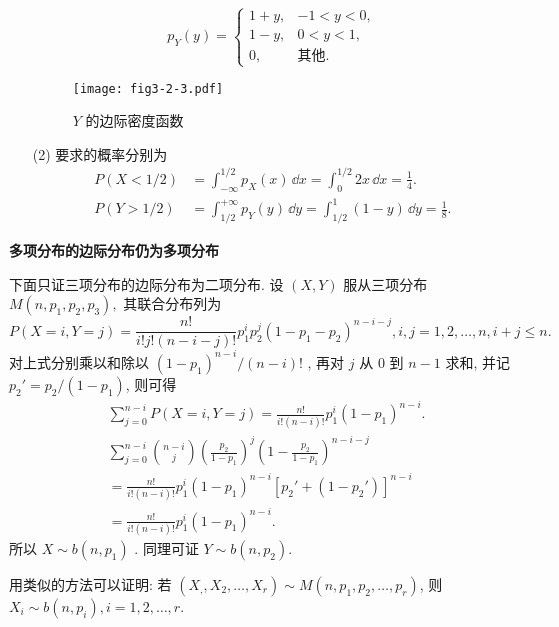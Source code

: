 \begin{solution}
\begin{itemize}
\begin{equation*}
  		p_{Y}(y)=
  		\begin{cases}
  		1+y, & -1<y<0,\\
  		1-y, & 0<y<1,\\
  		0, & \text{其他}.
  		\end{cases}
  		\end{equation*}
  		\begin{figure}[h]
  			\centering
  			\texttt{[image: fig3-2-3.pdf]}
  			\caption{ $Y$ 的边际密度函数}\label{fig:3.2.3}
  		\end{figure}
  		\item[(2)] 要求的概率分别为
  		\begin{align*}
  		P(X<1/2) &= \int_{-\infty}^{1/2}p_{X}(x)\,\dd x=\int_{0}^{1/2}2x\,\dd x=\frac{1}{4}.\\
  		P(Y>1/2) &= \int_{1/2}^{+\infty}p_{Y}(y)\,\dd y=\int_{1/2}^{1}(1-y)\,\dd y=\frac{1}{8}.
  		\end{align*}
  	\end{itemize}
  \end{solution}
  
  \begin{example}\label{exam:3.2.4}
  	\textbf{多项分布的边际分布仍为多项分布}
  \end{example}
  \begin{solution}
  	下面只证三项分布的边际分布为二项分布. 设 $(X,Y)$ 服从三项分布 $M(n,p_1,p_2,p_3),$  其联合分布列为
  	\begin{equation*}
  	P(X=i,Y=j)=\frac{n!}{i!j!(n-i-j)!}p_1^ip_2^j(1-p_1-p_2)^{n-i-j}, i,j=1,2,\ldots,n,i+j\leqslant n.
  	\end{equation*}
  	对上式分别乘以和除以 $(1-p_1)^{n-i}/(n-i)!$ , 再对 $j$ 从 $0$ 到 $n-1$ 求和, 并记 $p_2'=p_2/(1-p_1)$, 则可得
  	\begin{align*}
  	&\sum_{j=0}^{n-i}P(X=i,Y=j) = \frac{n!}{i!(n-i)!}p_1^i(1-p_1)^{n-i}.\\
  	&\sum_{j=0}^{n-i} \binom{n-i}{j} \left(\frac{p_2}{1-p_1}\right)^{j}\left(1-\frac{p_2}{1-p_1}\right)^{n-i-j} \\
  	&= \frac{n!}{i!(n-i)!}p_1^i(1-p_1)^{n-i}\left[p_2'+(1-p_2')\right]^{n-i}\\
  	&= \frac{n!}{i!(n-i)!}p_1^i(1-p_1)^{n-i}.
  	\end{align*}
  	所以 $X\sim b(n,p_1)$ . 同理可证 $Y\sim b(n,p_2)$.
  	
  	用类似的方法可以证明: 若 $(X_,,X_2,\ldots,X_r)\sim M(n,p_1,p_2,\ldots,p_r)$, 则 $X_i\sim b(n,p_i), i=1,2,\ldots,r$.
  \end{solution}
  

